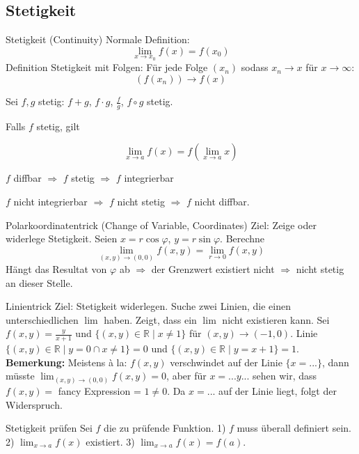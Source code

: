 \subsection{Stetigkeit}

\begin{Definition}{Stetigkeit (Continuity)}{}
    Normale Definition:
    \[
    \lim_{x\rightarrow x_0} f(x) = f(x_0)
    \]
    Definition Stetigkeit mit Folgen: Für jede Folge $(x_n)$ sodass $x_n \rightarrow x$ für $x\rightarrow \infty $:
    \[
    (f(x_n)) \rightarrow f(x)
    \]
\end{Definition}

Sei $f,g$ stetig: $f+g$, $f\cdot g$, $\frac{f}{g}$, $f \circ g$ stetig.

Falls $f$ stetig, gilt

\[
    \lim_{x \rightarrow a} f(x) = f(\lim_{x\rightarrow a} x)
\]

$f$ diffbar $\Rightarrow$ $f$ stetig $\Rightarrow$ $f$ integrierbar

$f$ nicht integrierbar $\Rightarrow$ $f$ nicht stetig $\Rightarrow$ $f$ nicht diffbar.\\

\begin{Rezept}{Polarkoordinatentrick (Change of Variable, Coordinates)}{}
    Ziel: Zeige oder widerlege Stetigkeit. Seien $x=r\cos \varphi$, $y=r\sin \varphi$. Berechne
    \[
    \lim_{(x, y) \rightarrow (0,0)} f(x, y) = \lim_{r \rightarrow 0} f(x, y)
    \]
    Hängt das Resultat von $\varphi$ ab $\Rightarrow$ der Grenzwert existiert nicht $\Rightarrow$ nicht stetig an dieser Stelle.
\end{Rezept}

\begin{Rezept}{Linientrick}{}
    Ziel: Stetigkeit widerlegen. Suche zwei Linien, die einen unterschiedlichen $\lim$ haben. Zeigt, dass ein $\lim$ nicht existieren kann.
    Sei $f(x, y)=\frac{y}{x+1}$ und $\{(x, y) \in \mathbb{R} \mid x \neq 1\}$ für $(x, y) \rightarrow (-1, 0)$. Linie $\{(x, y) \in \mathbb{R} \mid y=0\cap x \neq 1\}=0$ und $\{(x, y) \in \mathbb{R} \mid y=x+1\}=1$.\\
    
    \textbf{Bemerkung:} Meistens à la: $f(x,y)$ verschwindet auf der Linie $\{x=...\}$, dann müsste $\lim_{(x,y)\rightarrow(0,0)} f(x,y) = 0$, aber für $x=...y...$ sehen wir, dass
    $f(x,y) =$ fancy Expression = $1 \neq 0$. Da $x=...$ auf der Linie liegt, folgt der Widerspruch.
\end{Rezept}

\begin{Rezept}{Stetigkeit prüfen}{}
    Sei $f$ die zu prüfende Funktion. 1) $f$ muss überall definiert sein. 2) $\lim_{x \rightarrow a} f(x)$ existiert. 3) $\lim_{x \rightarrow a} f(x) = f(a)$.
\end{Rezept}
